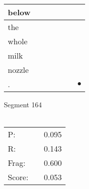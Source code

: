 \documentclass[landscape]{article}
\newcommand{\ssp}{\hspace{2pt}}
\newcommand{\mex}{\cellcolor{g}$\bullet$}
\begin{document}
\begin{tabular}{|l|p{10pt}|p{10pt}|p{10pt}|p{10pt}|p{10pt}|p{10pt}|}
\hline
\ssp below \ssp&\hspace{2pt}&\hspace{2pt}&\hspace{2pt}&\hspace{2pt}&\hspace{2pt}&\hspace{2pt}\\
\hline
\ssp the \ssp&\hspace{2pt}&\hspace{2pt}&\hspace{2pt}&\hspace{2pt}&\hspace{2pt}&\hspace{2pt}\\
\hline
\ssp whole \ssp&\hspace{2pt}&\hspace{2pt}&\hspace{2pt}&\hspace{2pt}&\hspace{2pt}&\hspace{2pt}\\
\hline
\ssp milk \ssp&\hspace{2pt}&\hspace{2pt}&\hspace{2pt}&\hspace{2pt}&\hspace{2pt}&\hspace{2pt}\\
\hline
\ssp nozzle \ssp&\hspace{2pt}&\hspace{2pt}&\hspace{2pt}&\hspace{2pt}&\hspace{2pt}&\hspace{2pt}\\
\hline
\ssp \cellcolor{ref5}. \ssp&\hspace{2pt}&\hspace{2pt}&\hspace{2pt}&\hspace{2pt}&\hspace{2pt}&\hspace{2pt}\mex\\
\hline
\end{tabular}

\vspace{6pt}
\noindent Segment 164\\\\
\noindent\begin{tabular}{lm{12pt}r}
\hline
P:&&0.095\\
R:&&0.143\\
Frag:&&0.600\\
Score:&&0.053\\
\end{tabular}
\end{document}
